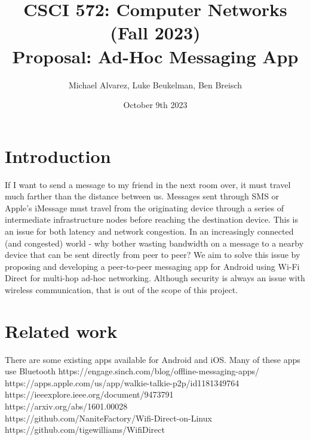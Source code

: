 \documentclass[10pt]{article}
\title{{\normalsize CSCI 572: Computer Networks (Fall 2023)}\\Proposal: Ad-Hoc Messaging App}
\author{Michael Alvarez, Luke Beukelman, Ben Breisch}
\date{October 9th 2023}
\begin{document}
\maketitle

\section{Introduction}
If I want to send a message to my friend in the next room over, it must travel much farther than the distance between us. Messages sent through SMS or Apple's iMessage must travel from the originating device through a series of intermediate infrastructure nodes before reaching the destination device. This is an issue for both latency and network congestion. In an increasingly connected (and congested) world - why bother wasting bandwidth on a message to a nearby device that can be sent directly from peer to peer? We aim to solve this issue by proposing and developing a peer-to-peer messaging app for Android using Wi-Fi Direct for multi-hop ad-hoc networking. Although security is always an issue with wireless communication, that is out of the scope of this project.
\section{Related work}
    There are some existing apps available for Android and iOS. Many of these apps use Bluetooth
    https://engage.sinch.com/blog/offline-messaging-apps/ \\
    https://apps.apple.com/us/app/walkie-talkie-p2p/id1181349764 \\
    https://ieeexplore.ieee.org/document/9473791 \\
    https://arxiv.org/abs/1601.00028 \\
    https://github.com/NaniteFactory/Wifi-Direct-on-Linux \\
    https://github.com/tigewilliams/WifiDirect
  
\end{document}
